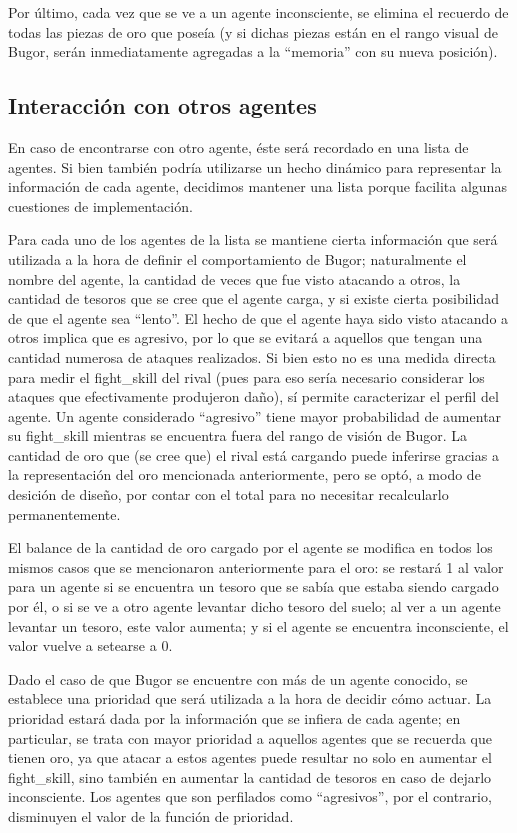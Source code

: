 \documentclass[a4paper,10pt,spanish]{article}
\begin{document}
		Por \'ultimo, cada vez que se ve a un agente inconsciente, se elimina el recuerdo de todas las piezas de oro que pose\'ia (y si dichas piezas est\'an en el rango visual de Bugor, ser\'an inmediatamente agregadas a la ``memoria'' con su nueva posici\'on).
		
	\subsection{Interacci\'on con otros agentes}
	
	En caso de encontrarse con otro agente, \'este ser\'a recordado en una lista de agentes. Si bien tambi\'en podr\'ia utilizarse un hecho din\'amico para representar la informaci\'on de cada agente, decidimos mantener una lista porque facilita algunas cuestiones de implementaci\'on.
	
	Para cada uno de los agentes de la lista se mantiene cierta informaci\'on que ser\'a utilizada a la hora de definir el comportamiento de Bugor; naturalmente el nombre del agente, la cantidad de veces que fue visto atacando a otros, la cantidad de tesoros que se cree que el agente carga, y si existe cierta posibilidad de que el agente sea ``lento''. El hecho de que el agente haya sido visto atacando a otros implica que es agresivo, por lo que se evitar\'a a aquellos que tengan una cantidad numerosa de ataques realizados. Si bien esto no es una medida directa para medir el fight\_skill del rival (pues para eso ser\'ia necesario considerar los ataques que efectivamente produjeron da\~no), s\'i permite caracterizar el perfil del agente. Un agente considerado ``agresivo'' tiene mayor probabilidad de aumentar su fight\_skill mientras se encuentra fuera del rango de visi\'on de Bugor. La cantidad de oro que (se cree que) el rival est\'a cargando puede inferirse gracias a la representaci\'on del oro mencionada anteriormente, pero se opt\'o, a modo de desici\'on de dise\~no, por contar con el total para no necesitar recalcularlo permanentemente.
	
	El balance de la cantidad de oro cargado por el agente se modifica en todos los mismos casos que se mencionaron anteriormente para el oro: se restar\'a 1 al valor para un agente si se encuentra un tesoro que se sab\'ia que estaba siendo cargado por \'el, o si se ve a otro agente levantar dicho tesoro del suelo; al ver a un agente levantar un tesoro, este valor aumenta; y si el agente se encuentra inconsciente, el valor vuelve a setearse a 0.
	
	Dado el caso de que Bugor se encuentre con m\'as de un agente conocido, se establece una prioridad que ser\'a utilizada a la hora de decidir c\'omo actuar. La prioridad estar\'a dada por la informaci\'on que se infiera de cada agente; en particular, se trata con mayor prioridad a aquellos agentes que se recuerda que tienen oro, ya que atacar a estos agentes puede resultar no solo en aumentar el fight\_skill, sino tambi\'en en aumentar la cantidad de tesoros en caso de dejarlo inconsciente. Los agentes que son perfilados como ``agresivos'', por el contrario, disminuyen el valor de la funci\'on de prioridad.
	
\end{document}
